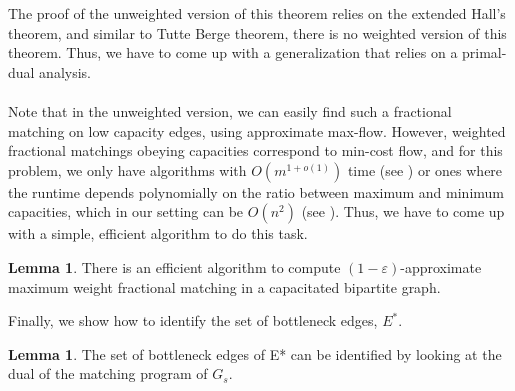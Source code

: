 \documentclass[a4paper,11pt]{article}
\newcommand{\eps}{\varepsilon}
\theoremstyle{definition}
\theoremstyle{definition}
\theoremstyle{definition}
\theoremstyle{definition}
\theoremstyle{definition}
\newtheorem{lemma2}[definition2]{Lemma}
\theoremstyle{definition}
\theoremstyle{definition}
\theoremstyle{definition}
\theoremstyle{definition}
\theoremstyle{definition}
\theoremstyle{definition}
\theoremstyle{definition}
\theoremstyle{definition}
\theoremstyle{definition}
\theoremstyle{definition}
\begin{document}
The proof of the unweighted version of this theorem relies on the extended Hall's theorem, and similar to Tutte Berge theorem, there is no weighted version of this theorem. Thus, we have to come up with a generalization that relies on a primal-dual analysis. \\ \\
Note that in the unweighted version, we can easily find such a fractional matching on low capacity edges, using approximate max-flow. However, weighted fractional matchings obeying capacities correspond to min-cost flow, and for this problem, we only have algorithms with $O(m^{1+o(1)})$ time (see \cite{BPT20,BrandCKLPGSS}) or ones where the runtime depends polynomially on the ratio between maximum and minimum capacities, which in our setting can be $O(n^2)$ (see \cite{GoldbergHKT17}). Thus, we have to come up with a simple, efficient algorithm to do this task.

\begin{lemma2}
There is an efficient algorithm to compute $(1-\eps)$-approximate maximum weight fractional matching in a capacitated bipartite graph. 
\end{lemma2}

Finally, we show how to identify the set of bottleneck edges, $E^*$.

\begin{lemma2}The set of bottleneck edges of E* can be identified by looking at the dual of the matching program of $G_s$. 
\end{lemma2}
\end{document}
